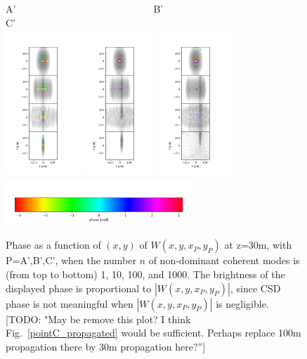 \documentclass{iucr}              %
\newcommand{\todo}[1]{{\color{red}[TODO: "#1'']}}
\newcommand{\inblue}[1]{{\color{blue}#1}}
\begin{document}
\begin{figure}
\caption{Phase as a function of $(x,y)$ of $W(x,y,x_P,y_P)$ at z=30m, with P=A',B',C', when the number $n$ of non-dominant coherent modes is (from top to bottom) 1, 10, 100, and 1000. The brightness of the displayed phase is proportional to $|W(x,y,x_P,y_P)|$, since CSD phase is not meaningful when $|W(x,y,x_P,y_P)|$ is negligible. \todo{May be remove this plot? I think \inblue{Fig.~\ref{pointC_propagated}} would be sufficient. Perhaps replace 100m propagation there by 30m propagation here?} }
A'~~~~~~~~~~~~~~~~~~~~~~~~~~~~B'~~~~~~~~~~~~~~~~~~~~~~~~~~~~C'\\
\includegraphics[width=2.75cm]{Figures/vx_id16a_A_propagated.png}
\includegraphics[width=2.75cm]{Figures/vx_id16a_B_propagated.png}
\includegraphics[width=2.75cm]{Figures/vx_id16a_C_propagated.png}
\includegraphics[width=7cm]{Figures/color_bar.png}
\label{points_propagated30}
\end{figure}
\end{document}
